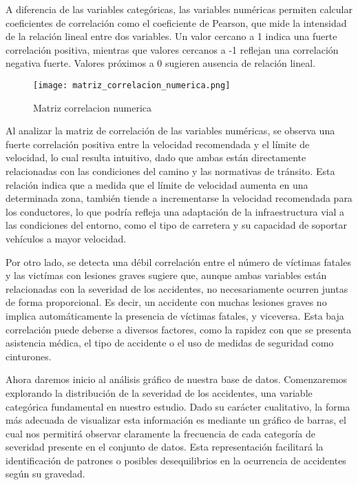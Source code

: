 \documentclass{book}
\begin{document}
A diferencia de las variables categóricas, las variables numéricas permiten calcular coeficientes de correlación como el coeficiente de Pearson, que mide la intensidad de la relación lineal entre dos variables. Un valor cercano a 1 indica una fuerte correlación positiva, mientras que valores cercanos a -1 reflejan una correlación negativa fuerte. Valores próximos a 0 sugieren ausencia de relación lineal.

\begin{figure}[htbp]
\centering
\texttt{[image: matriz\_correlacion\_numerica.png]}
\caption{\label{fig:matriz correlacion numerica}Matriz correlacion numerica}
\end{figure}

Al analizar la matriz de correlación de las variables numéricas, se observa una fuerte correlación positiva entre la velocidad recomendada y el límite de velocidad, lo cual resulta intuitivo, dado que ambas están directamente relacionadas con las condiciones del camino y las normativas de tránsito. Esta relación indica que a medida que el límite de velocidad aumenta en una determinada zona, también tiende a incrementarse la velocidad recomendada para los conductores, lo que podría refleja una adaptación de la infraestructura vial a las condiciones del entorno, como el tipo de carretera y su capacidad de soportar vehículos a mayor velocidad.

Por otro lado, se detecta una débil correlación entre el número de víctimas fatales y las victímas con lesiones graves sugiere que, aunque ambas variables están relacionadas con la severidad de los accidentes, no necesariamente ocurren juntas de forma proporcional. Es decir, un accidente con muchas lesiones graves no implica automáticamente la presencia de víctimas fatales, y viceversa. Esta baja correlación puede deberse a diversos factores, como la rapidez con que se presenta asistencia médica, el tipo de accidente o el uso de medidas de seguridad como cinturones.

Ahora daremos inicio al análisis gráfico de nuestra base de datos. Comenzaremos explorando la distribución de la severidad de los accidentes, una variable categórica fundamental en nuestro estudio. Dado su carácter cualitativo, la forma más adecuada de visualizar esta información es mediante un gráfico de barras, el cual nos permitirá observar claramente la frecuencia de cada categoría de severidad presente en el conjunto de datos. Esta representación facilitará la identificación de patrones o posibles desequilibrios en la ocurrencia de accidentes según su gravedad.
\end{document}

